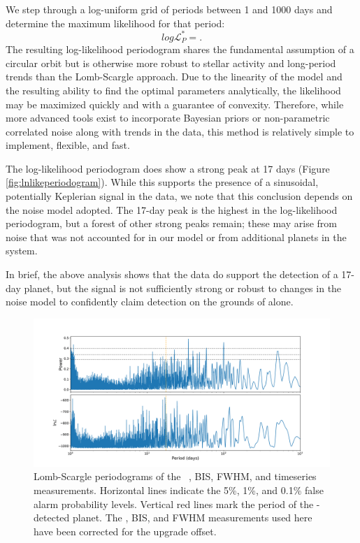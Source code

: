 \documentclass[modern]{aastex62}
\begin{document}
We step through a log-uniform grid of periods between 1 and 1000 days and determine the maximum likelihood for that period:
\begin{equation}
    log\mathcal{L}^*_P = .
\end{equation}
The resulting log-likelihood periodogram shares the fundamental assumption of a circular orbit but is otherwise more robust to stellar activity and long-period trends than the Lomb-Scargle approach. 
Due to the linearity of the model and the resulting ability to find the optimal parameters analytically, the likelihood may be maximized quickly and with a guarantee of convexity. 
Therefore, while more advanced tools exist to incorporate Bayesian priors \citep{Olspert2018} or non-parametric correlated noise \citep{Feng2017} along with trends in the data, this method is relatively simple to implement, flexible, and fast.

The log-likelihood periodogram does show a strong peak at 17 days (Figure \ref{fig:lnlikeperiodogram}). 
While this supports the presence of a sinusoidal, potentially Keplerian signal in the data, we note that this conclusion depends on the noise model adopted. 
The 17-day peak is the highest in the log-likelihood periodogram, but a forest of other strong peaks remain; these may arise from noise that was not accounted for in our model or from additional planets in the system. 

In brief, the above analysis shows that the \RV data do support the detection of a 17-day planet, but the signal is not sufficiently strong or robust to changes in the noise model to confidently claim detection on the grounds of \RVs alone.



\begin{figure}
    \centering
    \includegraphics[width=\textwidth]{periodograms.pdf}
    \caption{Lomb-Scargle periodograms of the \HARPS\ \RV, BIS, FWHM, and \shk timeseries measurements. Horizontal lines indicate the 5\%, 1\%, and 0.1\% false alarm probability levels. Vertical red lines mark the period of the \TESS-detected planet. The \RV, BIS, and FWHM measurements used here have been corrected for the \HARPS upgrade offset.}
    \label{fig:periodograms}
\end{figure}
\end{document}
